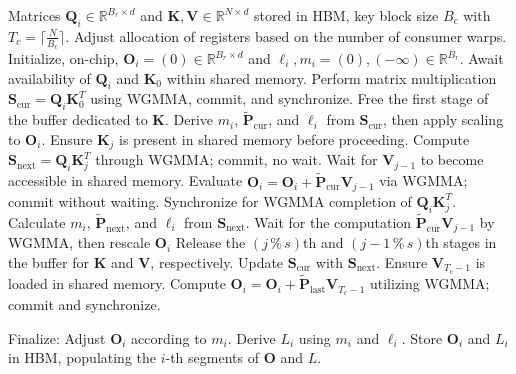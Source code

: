\begin{algorithm}[H]
    \caption{\small\label{alg:flash3_wgmma}\textsc{FlashAttention-3} consumer warpgroup forward pass}
    \begin{algorithmic}[1]
      \REQUIRE  Matrices $\mathbf{Q}_i \in \mathbb{R}^{B_r \times d}$ and $\mathbf{K}, \mathbf{V} \in \mathbb{R}^{N \times d}$ stored in HBM, key block size $B_c$ with $T_c = \lceil \frac{N}{B_c} \rceil$.
      \STATE Adjust allocation of registers based on the number of consumer warps.
      \STATE Initialize, on-chip, $\mathbf{O}_i = (0) \in \mathbb{R}^{B_r \times d}$ and $\ell_i, m_i = (0), (-\infty) \in \mathbb{R}^{B_r}$.
      \STATE Await availability of $\mathbf{Q}_i$ and $\mathbf{K}_0$ within shared memory.
      \STATE Perform matrix multiplication $\mathbf{S}_{\mathrm{cur}} = \mathbf{Q}_i \mathbf{K}_0^T$ using WGMMA, commit, and synchronize.
      \STATE Free the first stage of the buffer dedicated to $\mathbf{K}$.
      \STATE Derive $m_i$, $\tilde{\mathbf{P}}_{\mathrm{cur}}$, and $\ell_i$ from $\mathbf{S}_{\mathrm{cur}}$, then apply scaling to $\mathbf{O}_i$.
        \STATE Ensure $\mathbf{K}_j$ is present in shared memory before proceeding.
        \label{code:mainloop_start}
        \STATE Compute $\mathbf{S}_{\mathrm{next}} = \mathbf{Q}_i \mathbf{K}_j^T$ through WGMMA; commit, no wait. \label{code:first_wgmma}
        \STATE Wait for $\mathbf{V}_{j-1}$ to become accessible in shared memory.
        \STATE Evaluate $\mathbf{O}_i = \mathbf{O}_i + \tilde{\mathbf{P}}_{\mathrm{cur}} \mathbf{V}_{j-1}$ via WGMMA; commit without waiting. \label{code:second_wgmma}
        \STATE Synchronize for WGMMA completion of $\mathbf{Q}_i \mathbf{K}_j^T$.
        \STATE Calculate $m_i$, $\tilde{\mathbf{P}}_{\mathrm{next}}$, and $\ell_i$ from $\mathbf{S}_{\mathrm{next}}$. \label{code:softmax}
        \STATE Wait for the computation $\tilde{\mathbf{P}}_{\mathrm{cur}} \mathbf{V}_{j-1}$ by WGMMA, then rescale $\mathbf{O}_i$
        \STATE Release the $(j\,\%\,s)$th and $(j-1\,\%\,s)$th stages in the buffer for $\mathbf{K}$ and $\mathbf{V}$, respectively.
        \STATE Update $\mathbf{S}_{\mathrm{cur}}$ with $\mathbf{S}_{\mathrm{next}}$.
        \label{code:mainloop_end}
      \ENDFOR \STATE Ensure $\mathbf{V}_{T_c - 1}$ is loaded in shared memory.
      \STATE Compute
      $\mathbf{O}_i = \mathbf{O}_i + \tilde{\mathbf{P}}_{\mathrm{last}} \mathbf{V}_{T_c - 1}$ utilizing WGMMA; commit and synchronize.

\STATE Finalize: Adjust $\mathbf{O}_{i}$ according to $m_{i}$. Derive $L_{i}$ using $m_{i}$ and $\ell_{i}$.
    Store $\mathbf{O}_{i}$ and $L_{i}$ in HBM, populating the $i$-th segments of $\mathbf{O}$ and $L$.
\end{algorithmic}
\end{algorithm}

